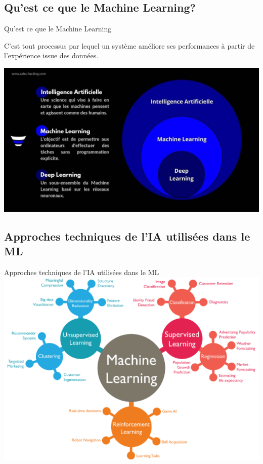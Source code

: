 \documentclass{beamer}
\begin{document}
\subsection{Qu'est ce que le Machine Learning?}
		\begin{frame}{Qu'est ce que le Machine Learning}
	
	C'est tout processus par lequel un système améliore ses performances à partir de l'expérience issue des données.
	
	\centering
	\includegraphics[width=\linewidth]{compar.png}
	\end{frame}

\subsection{Approches techniques de l'IA utilisées dans le ML}
\begin{frame}{Approches techniques de l'IA utilisées dans le ML}
	\centering
	\includegraphics[width=0.9\linewidth]{tml.png}
\end{frame}
\end{document}
